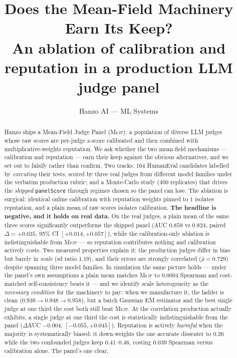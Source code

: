 \documentclass[11pt]{article}
\title{\textbf{Does the Mean-Field Machinery Earn Its Keep?}\\[2mm]
\large An ablation of calibration and reputation in a production LLM judge panel}
\author{Hanzo AI --- ML Systems}
\date{}
\theoremstyle{definition}
\newcommand{\rhobar}{\ensuremath{\bar{\rho}}}
\newcommand{\mfjp}{\textsc{Mfjp}}
\begin{document}
\maketitle

\begin{abstract}
Hanzo ships a Mean-Field Judge Panel (\mfjp): a population of diverse LLM judges whose raw
scores are per-judge z-score calibrated and then combined with multiplicative-weights
reputation. We ask whether the two mean-field mechanisms --- calibration and reputation ---
earn their keep against the obvious alternatives, and we set out to falsify rather than
confirm. Two tracks: 164 HumanEval candidates labelled by \emph{executing} their tests,
scored by three real judges from different model families under the verbatim production
rubric; and a Monte-Carlo study ($400$ replicates) that drives the \emph{shipped}
\texttt{panelScore} through regimes chosen so the panel can lose. The ablation is surgical:
identical online calibration with reputation weights pinned to $1$ isolates reputation, and a
plain mean of raw scores isolates calibration.
\textbf{The headline is negative, and it holds on real data.} On the real judges, a plain mean
of the same three scores significantly outperforms the shipped panel (AUC $0.859$ vs $0.824$,
paired $\Delta=+0.035$, 95\% CI $[+0.014,+0.057]$), while the calibration-only ablation is
indistinguishable from \mfjp{} --- so reputation contributes nothing and calibration actively
costs. Two measured properties explain it: the production judges differ in bias but barely in
\emph{scale} (sd ratio $1.19$), and their errors are strongly correlated ($\rhobar=0.729$)
despite spanning three model families. In simulation the same picture holds --- under the
panel's own assumptions a plain mean matches \mfjp{} to $0.0004$ Spearman and cost-matched
self-consistency beats it --- and we identify scale heterogeneity as the \emph{necessary
condition} for the machinery to pay: when we manufacture it, the ladder is clean
($0.938 \to 0.948 \to 0.958$), but a batch Gaussian EM estimator and the best single judge at
one third the cost both still beat \mfjp{}. At the correlation production actually exhibits, a
single judge at one third the cost is statistically indistinguishable from the panel
($\Delta$AUC $-0.004$, $[-0.055,+0.045]$).
Reputation is actively \emph{harmful} when the majority is systematically biased: it
down-weights the one accurate dissenter to $0.26$ while the two confounded judges keep
$0.41$--$0.46$, costing $0.039$ Spearman versus calibration alone. The panel's one clear,

\end{abstract}
\end{document}

